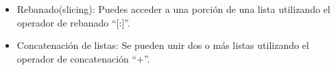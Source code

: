 \begin{itemize}
    \item Rebanado(slicing): Puedes acceder a una porción de una lista utilizando el operador de rebanado ``[:]''.
    \begin{figure}[h]
        \centering
      \end{figure}
    \newpage
    \item Concatenación de listas: Se pueden unir dos o más listas utilizando el operador de concatenación ``+''. 
    \begin{figure}[h]
        \centering
      \end{figure}
    

\end{itemize}
